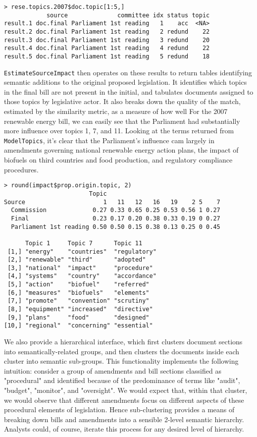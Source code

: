 \documentclass[11pt]{article}
\begin{document}
\begin{verbatim}
> rese.topics.2007$doc.topic[1:5,]
            source              committee idx status topic
result.1 doc.final Parliament 1st reading   1    acc  <NA>
result.2 doc.final Parliament 1st reading   2 redund    22
result.3 doc.final Parliament 1st reading   3 redund    20
result.4 doc.final Parliament 1st reading   4 redund    22
result.5 doc.final Parliament 1st reading   5 redund    18
\end{verbatim}

\texttt{EstimateSourceImpact} then operates on these results to return
tables identifying semantic additions to the original proposed
legislation. It identifies which topics in the final bill are not
present in the initial, and tabulates documents assigned to those
topics by legislative actor. It also breaks down the quality of the
match, estimated by the similarity metric, as a measure of how well
For the 2007 renewable energy bill, we can easily see that the
Parliament had substantially more influence over topics 1, 7, and
11. Looking at the terms returned from \texttt{ModelTopics}, it's
clear that the Parliament's influence cam largely in amendments
governing national renewable energy action plans, the impact of
biofuels on third countries and food production, and regulatory
compliance procedures. 

\begin{verbatim}
> round(impact$prop.origin.topic, 2)
                        Topic
Source                      1   11   12   16   19    2 5    7
  Commission             0.27 0.33 0.65 0.25 0.53 0.56 1 0.27
  Final                  0.23 0.17 0.20 0.38 0.33 0.19 0 0.27
  Parliament 1st reading 0.50 0.50 0.15 0.38 0.13 0.25 0 0.45

      Topic 1     Topic 7      Topic 11    
 [1,] "energy"    "countries"  "regulatory"
 [2,] "renewable" "third"      "adopted"   
 [3,] "national"  "impact"     "procedure" 
 [4,] "systems"   "country"    "accordance"
 [5,] "action"    "biofuel"    "referred"  
 [6,] "measures"  "biofuels"   "elements"  
 [7,] "promote"   "convention" "scrutiny"  
 [8,] "equipment" "increased"  "directive" 
 [9,] "plans"     "food"       "designed"  
[10,] "regional"  "concerning" "essential" 
\end{verbatim}

We also provide a hierarchical interface, which first clusters document
sections into semantically-related groups, and then clusters the
documents inside each cluster into semantic sub-groups. This
functionality implements the following intuition: consider a group of
amendments and bill sections classified as "procedural" and identified
because of the predominance of terms like "audit", "budget",
"monitor", and "oversight". We would expect that, within that cluster,
we would observe that different amendments focus on different aspects
of these procedural elements of legislation. Hence sub-clustering
provides a means of breaking down bills and amendments into a sensible
2-level semantic hierarchy. Analysts could, of course, iterate this
process for any desired level of hierarchy. 
\end{document}
